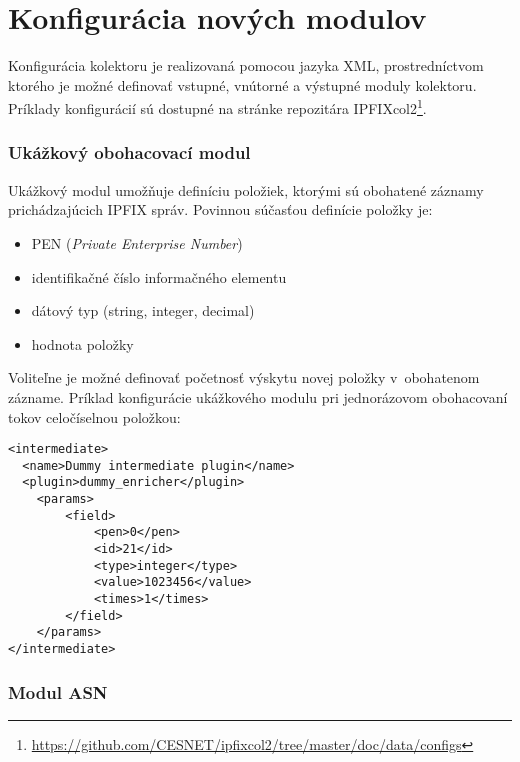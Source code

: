 \chapter{Konfigurácia nových modulov}
\label{appendix:configuration}
Konfigurácia kolektoru je realizovaná pomocou jazyka XML, prostredníctvom ktorého je možné definovať vstupné, vnútorné a výstupné moduly kolektoru.
Príklady konfigurácií sú dostupné na stránke repozitára IPFIXcol2\footnote{\url{https://github.com/CESNET/ipfixcol2/tree/master/doc/data/configs}}.

\subsection*{Ukážkový obohacovací modul}

Ukážkový modul umožňuje definíciu položiek, ktorými sú obohatené záznamy prichádzajúcich IPFIX správ. Povinnou súčasťou definície položky je:
\begin{itemize}
    \setlength\itemsep{-0.5em}
    \item PEN (\textit{Private Enterprise Number})
    \item identifikačné číslo informačného elementu
    \item dátový typ (string, integer, decimal)
    \item hodnota položky
\end{itemize}

\noindent Voliteľne je možné definovať početnosť výskytu novej položky v~obohatenom zázname. Príklad konfigurácie ukážkového modulu pri jednorázovom obohacovaní tokov celočíselnou položkou:



\lstset{language=myXML}
\begin{lstlisting}
<intermediate>
  <name>Dummy intermediate plugin</name>
  <plugin>dummy_enricher</plugin>
    <params>
        <field>
            <pen>0</pen>
            <id>21</id>
            <type>integer</type>
            <value>1023456</value>
            <times>1</times>
        </field>
    </params>
</intermediate>
\end{lstlisting} \newpage

\subsection*{Modul ASN}

